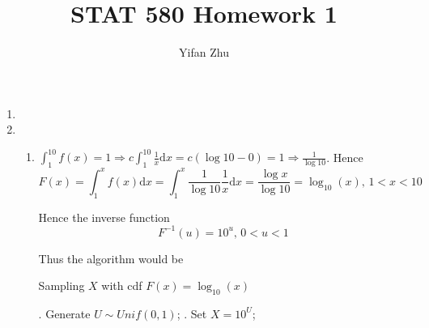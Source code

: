 \documentclass{article}
\begin{document}
	

	
	\title{STAT 580 Homework 1}
	\author{Yifan Zhu}
	\maketitle
	
	\begin{enumerate}[leftmargin = 0 em, label = \arabic*., font = \bfseries]
	\item 
	

	
	\item 
	\begin{enumerate}
		\item 
		$\int_{1}^{10} f(x) = 1 \Rightarrow c \int_{1}^{10} \frac{1}{x} \mathrm{d}x= c (\log 10 - 0) = 1 \Rightarrow \frac{1}{\log 10}$. Hence
		\[F(x) = \int_{1}^x f(x) \mathrm{d}x = \int_{1}^x \frac{1}{\log 10} \frac{1}{x} \mathrm{d}x = \frac{\log x}{\log 10} = \log_{10} (x) ,\, 1 < x < 10\]

		Hence the inverse function
		\[F^{-1}(u) = 10^u,\, 0<u<1\]

		Thus the algorithm would be
		\begin{algorithm}
			\caption{Sampling $X$ with cdf $F(x) = \log_{10}(x)$}
			\begin{algorithmic}
				. Generate $U \sim Unif(0,1)$;
				. Set $X = 10^U$;
			\end{algorithmic}
		\end{algorithm}

	\end{enumerate}
	

 	\end{enumerate}


	
	
	
	
\end{document}
